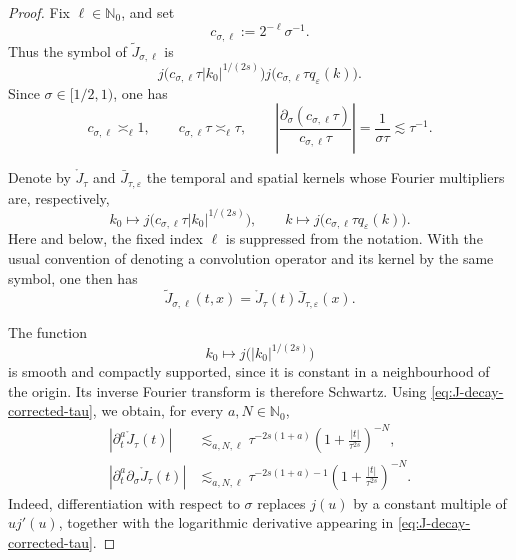 \documentclass{article}
\numberwithin{equation}{section}
\newcommand{\assign}{:=}
\theoremstyle{plain}
\theoremstyle{definition}
\begin{document}
\begin{proof}
	Fix \(\ell\in\mathbb N_0\), and set
	\[
	c_{\sigma,\ell}\assign 2^{-\ell}\sigma^{-1}.
	\]
	Thus the symbol of \(\tilde J_{\sigma,\ell}\) is
	\[
	j\bigl(c_{\sigma,\ell}\tau |k_0|^{1/(2s)}\bigr)
	j\bigl(c_{\sigma,\ell}\tau q_\varepsilon(k)\bigr).
	\]
	Since \(\sigma\in[1/2,1)\), one has
	\begin{equation}
		c_{\sigma,\ell}\asymp_\ell 1,
		\qquad
		c_{\sigma,\ell}\tau\asymp_\ell\tau,
		\qquad
		\left|
		\frac{\partial_\sigma(c_{\sigma,\ell}\tau)}
		{c_{\sigma,\ell}\tau}
		\right|
		=\frac1{\sigma\tau}
		\lesssim\tau^{-1}.
		\label{eq:J-decay-corrected-tau}
	\end{equation}
	
	Denote by \(\mathring J_\tau\) and
	\(\bar J_{\tau,\varepsilon}\) the temporal and spatial kernels whose
	Fourier multipliers are, respectively,
	\[
	k_0\longmapsto
	j\bigl(c_{\sigma,\ell}\tau |k_0|^{1/(2s)}\bigr),
	\qquad
	k\longmapsto
	j\bigl(c_{\sigma,\ell}\tau q_\varepsilon(k)\bigr).
	\]
	Here and below, the fixed index \(\ell\) is suppressed from the notation.
	With the usual convention of denoting a convolution operator and its
	kernel by the same symbol, one then has
	\begin{equation}
		\tilde J_{\sigma,\ell}(t,x)
		=\mathring J_\tau(t)\bar J_{\tau,\varepsilon}(x).
		\label{eq:J-decay-corrected-factorisation}
	\end{equation}
	
	The function
	\[
	k_0\longmapsto j\bigl(|k_0|^{1/(2s)}\bigr)
	\]
	is smooth and compactly supported, since it is constant in a
	neighbourhood of the origin.  Its inverse Fourier transform is therefore
	Schwartz.  Using \eqref{eq:J-decay-corrected-tau}, we obtain, for every
	\(a,N\in\mathbb N_0\),
	\begin{align}
		|\partial_t^a\mathring J_\tau(t)|
		&\lesssim_{a,N,\ell}
		\tau^{-2s(1+a)}
		\left(1+\frac{|t|}{\tau^{2s}}\right)^{-N},
		\label{eq:J-decay-corrected-time-proof}
		\\
		|\partial_t^a\partial_\sigma\mathring J_\tau(t)|
		&\lesssim_{a,N,\ell}
		\tau^{-2s(1+a)-1}
		\left(1+\frac{|t|}{\tau^{2s}}\right)^{-N}.
		\label{eq:J-decay-corrected-time-sigma-proof}
	\end{align}
	Indeed, differentiation with respect to \(\sigma\) replaces \(j(u)\)
	by a constant multiple of \(u j'(u)\), together with the logarithmic
	derivative appearing in \eqref{eq:J-decay-corrected-tau}.
	

\end{proof}
\end{document}
